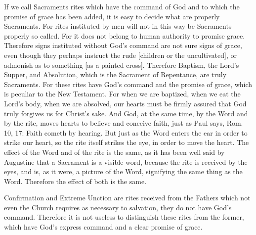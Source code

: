 If we call Sacraments rites which have the command of God and to
which the promise of grace has been added, it is easy to decide what
are properly Sacraments.  For rites instituted by men will not in
this way be Sacraments properly so called.  For it does not belong to
human authority to promise grace.  Therefore signs instituted without
God's command are not sure signs of grace, even though they perhaps
instruct the rude [children or the uncultivated], or admonish as to
something [as a painted cross].  Therefore Baptism, the Lord's Supper,
and Absolution, which is the Sacrament of Repentance, are truly
Sacraments.  For these rites have God's command and the promise of
grace, which is peculiar to the New Testament.  For when we are
baptized, when we eat the Lord's body, when we are absolved, our
hearts must be firmly assured that God truly forgives us for Christ's
sake.  And God, at the same time, by the Word and by the rite, moves
hearts to believe and conceive faith, just as Paul says, Rom. 10, 17:
Faith cometh by hearing.  But just as the Word enters the ear in
order to strike our heart, so the rite itself strikes the eye, in
order to move the heart.  The effect of the Word and of the rite is
the same, as it has been well said by Augustine that a Sacrament is a
visible word, because the rite is received by the eyes, and is, as it
were, a picture of the Word, signifying the same thing as the Word.
Therefore the effect of both is the same.

Confirmation and Extreme Unction are rites received from the Fathers
which not even the Church requires as necessary to salvation, they do
not have God's command.  Therefore it is not useless to distinguish
these rites from the former, which have God's express command and a
clear promise of grace.

